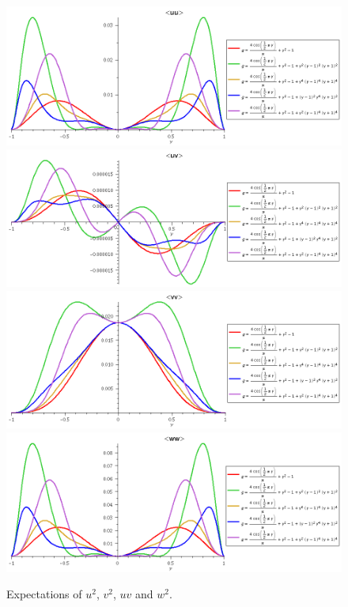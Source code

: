 \documentclass[10pt]{article}
\begin{document}
\begin{figure}[thb]
\centering
\includegraphics[scale=0.25]{uu.png}
\includegraphics[scale=0.25]{uv.png}
\includegraphics[scale=0.25]{vv.png}
\includegraphics[scale=0.25]{ww.png}
  \\[-0.2cm]
  \caption{Expectations of $u^2$, $v^2$, $uv$ and $w^2$.
           \label{fig:expectations}}
\end{figure}
\end{document}
